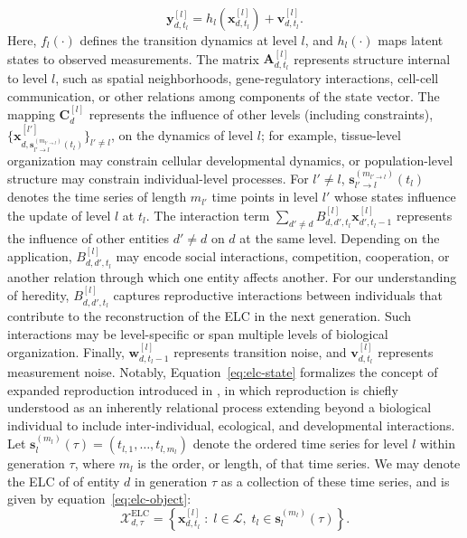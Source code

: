 \documentclass[pdflatex,sn-mathphys-num]{sn-jnl}
\theoremstyle{thmstylethree}
\theoremstyle{thmstyleone}
\begin{document}
\begin{equation}
\mathbf{y}_{d,t_l}^{[l]}
=
h_l\!\left(
\mathbf{x}_{d,t_l}^{[l]}
\right)
+
\mathbf{v}_{d,t_l}^{[l]} .
\label{eq:elc-measurement}
\end{equation}
Here, $f_l(\cdot)$ defines the transition dynamics at level $l$, and $h_l(\cdot)$ maps latent states to observed measurements. The matrix $\mathbf{A}_{d,t_l}^{[l]}$ represents structure internal to level $l$, such as spatial neighborhoods, gene-regulatory interactions, cell-cell communication, or other relations among components of the state vector. The mapping $\mathbf{C}_{d}^{[l]}$ represents the influence of other levels (including constraints), $\{\mathbf{x}_{d,\mathbf{s}_{l'\to l}^{(m_{l'\to l})}(t_l)}^{[l']}\}_{l' \neq l}$, on the dynamics of level $l$; for example, tissue-level organization may constrain cellular developmental dynamics, or population-level structure may constrain individual-level processes. For $l' \neq l$, $\mathbf{s}_{l'\to l}^{(m_{l'\to l})}(t_l)$ denotes the time series of length $m_{l'}$ time points in level $l'$ whose states influence the update of level $l$ at $t_l$. The interaction term $\sum_{d' \neq d} B_{d,d',t_l}^{[l]} \mathbf{x}_{d',t_l-1}^{[l]}$ represents the influence of other entities $d' \neq d$ on $d$ at the same level. Depending on the application, $B_{d,d',t_l}^{[l]}$ may encode social interactions, competition, cooperation, or another relation through which one entity affects another. For our understanding of heredity, $B_{d,d',t_l}^{[l]}$ captures reproductive interactions between individuals that contribute to the reconstruction of the ELC in the next generation. Such interactions may be level-specific or span multiple levels of biological organization. Finally, $\mathbf{w}_{d,t_l-1}^{[l]}$ represents transition noise, and $\mathbf{v}_{d,t_l}^{[l]}$ represents measurement noise. Notably, Equation~\ref{eq:elc-state} formalizes the concept of expanded reproduction introduced in \cite{etxeberria2026expanded}, in which reproduction is chiefly understood as an inherently relational process extending beyond a biological individual to include inter-individual, ecological, and developmental interactions. Let $\mathbf{s}_{l}^{(m_l)}(\tau) = (t_{l,1}, \ldots, t_{l,m_l})$ denote the ordered time series for level $l$ within generation $\tau$, where $m_l$ is the order, or length, of that time series. We may denote the ELC of of entity $d$ in generation $\tau$ as a collection of these time series, and is given by equation~\eqref{eq:elc-object}:
\begin{equation}
\mathcal{X}_{d,\tau}^{\text{ELC}}
=
\left\{
\mathbf{x}_{d,t_l}^{[l]}
\;:\;
l \in \mathcal{L},\;
t_l \in \mathbf{s}_{l}^{(m_l)}(\tau)
\right\}.
\label{eq:elc-object}
\end{equation}
\end{document}
